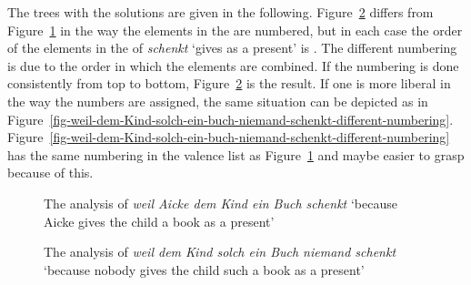 \begin{enumerate}
The trees with the solutions are given in the
following. Figure~\ref{fig-weil-dem-Kind-solch-ein-buch-niemand-schenkt} differs from
Figure~\ref{fig-weil-Aicke-dem-Kind-ein-buch-schenkt} in the way the elements in the \compsl are
numbered, but in each case the order of the elements in the \compsl of \emph{schenkt} `gives as a
present' is \sliste{ \npnom, \npdat, \npacc }. The different numbering is due to the order in which
the elements are combined. If the numbering is done consistently from top to bottom,
Figure~\ref{fig-weil-dem-Kind-solch-ein-buch-niemand-schenkt} is the result. If one is more liberal
in the way the numbers are assigned, the same situation can be depicted as in
Figure~\ref{fig-weil-dem-Kind-solch-ein-buch-niemand-schenkt-different-numbering}. Figure~\ref{fig-weil-dem-Kind-solch-ein-buch-niemand-schenkt-different-numbering}
has the same numbering in the valence list as Figure~\ref{fig-weil-Aicke-dem-Kind-ein-buch-schenkt}
and maybe easier to grasp because of this.

\begin{figure}
\caption{\label{fig-weil-Aicke-dem-Kind-ein-buch-schenkt}The analysis of \emph{weil Aicke dem Kind
    ein Buch schenkt} `because Aicke gives the child a book as a present'}
\end{figure}

\begin{figure}
\caption{\label{fig-weil-dem-Kind-solch-ein-buch-niemand-schenkt}The analysis of \emph{weil dem Kind
    solch ein Buch niemand schenkt} `because nobody gives the child such a book as a present'}
\end{figure}


\end{enumerate}
